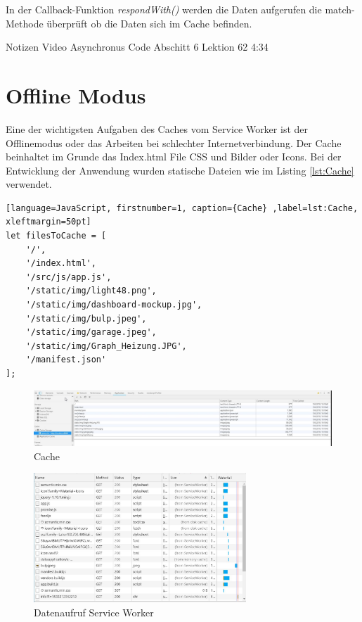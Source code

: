 In der Callback-Funktion \textit{respondWith()} werden die Daten aufgerufen die match-Methode überprüft ob die Daten sich im Cache befinden.

		
Notizen Video
	Asynchronus Code Abschitt 6 Lektion 62 4:34 
	 

\section{Offline Modus}
Eine der wichtigsten Aufgaben des Caches vom Service Worker ist der Offlinemodus oder das Arbeiten bei schlechter Internetverbindung. Der Cache beinhaltet im Grunde das Index.html File CSS und Bilder oder Icons. Bei der Entwicklung der Anwendung wurden statische Dateien wie im Listing \ref{lst:Cache} verwendet.


\begin{lstlisting}[language=JavaScript, firstnumber=1, caption={Cache} ,label=lst:Cache, xleftmargin=50pt]
let filesToCache = [
    '/',
    '/index.html',
    '/src/js/app.js',
    '/static/img/light48.png',
    '/static/img/dashboard-mockup.jpg',
    '/static/img/bulp.jpeg',
    '/static/img/garage.jpeg',
    '/static/img/Graph_Heizung.JPG',
    '/manifest.json'
];
\end{lstlisting}


\begin{figure}[h]
	\centering
	\includegraphics[width=16cm]{BilderAllgemein/Implementierung/Cache.jpg}\medskip
	\caption{Cache}
	\label{fig:Cache}
\end{figure}  

\begin{figure}[h]
	\centering
	\includegraphics[width=8cm]{BilderAllgemein/Implementierung/aufruf_SW_Browser.jpg}\medskip
	\caption{Datenaufruf Service Worker}
	\label{fig:aufrufSWBrowser}
\end{figure}  

